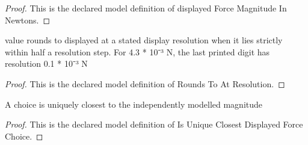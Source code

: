 \begin{proof}
  This is the declared model definition of displayed Force Magnitude In Newtons.
\end{proof}
\begin{definition}
  \label{def:physics:phyx-mini-0895:phyxminiproblems-problemphyxmini0895-roundstoatresolution}
  value rounds to displayed at a stated display resolution when it lies strictly within half a resolution step. For 4.3 * 10⁻³ N, the last printed digit has resolution 0.1 * 10⁻³ N
\end{definition}
\begin{proof}
  This is the declared model definition of Rounds To At Resolution.
\end{proof}
\begin{definition}
  \label{def:physics:phyx-mini-0895:phyxminiproblems-problemphyxmini0895-isuniqueclosestdisplayedforcechoice}
  A choice is uniquely closest to the independently modelled magnitude
\end{definition}
\begin{proof}
  This is the declared model definition of Is Unique Closest Displayed Force Choice.
\end{proof}
